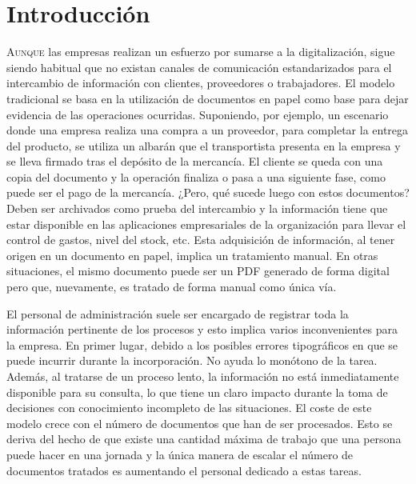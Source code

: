 

\chapter{Introducción}
\label{chap:introduccion}

\lettrine{A}{unque} las empresas realizan un esfuerzo por sumarse a la digitalización, sigue siendo habitual que no existan canales de comunicación estandarizados para el intercambio de información con clientes, proveedores o trabajadores. El modelo tradicional se basa en la utilización de documentos en papel como base para dejar evidencia de las operaciones ocurridas. Suponiendo, por ejemplo, un escenario donde una empresa realiza una compra a un proveedor, para completar la entrega del producto, se utiliza un albarán que el transportista presenta en la empresa y se lleva firmado tras el depósito de la mercancía. El cliente se queda con una copia del documento y la operación finaliza o pasa a una siguiente fase, como puede ser el pago de la mercancía. ¿Pero, qué sucede luego con estos documentos? Deben ser archivados como prueba del intercambio y la información tiene que estar disponible en las aplicaciones empresariales de la organización para llevar el control de gastos, nivel del stock, etc. Esta adquisición de información, al tener origen en un documento en papel, implica un tratamiento manual. En otras situaciones, el mismo documento puede ser un PDF generado de forma digital pero que, nuevamente, es tratado de forma manual como única vía.

El personal de administración suele ser encargado de registrar toda la información pertinente de los procesos y esto implica varios inconvenientes para la empresa. En primer lugar, debido a los posibles errores tipográficos en que se puede incurrir durante la incorporación. No ayuda lo monótono de la tarea. Además, al tratarse de un proceso lento, la información no está inmediatamente disponible para su consulta, lo que tiene un claro impacto durante la toma de decisiones con conocimiento incompleto de las situaciones. El coste de este modelo crece con el número de documentos que han de ser procesados. Esto se deriva del hecho de que existe una cantidad máxima de trabajo que una persona puede hacer en una jornada y la única manera de escalar el número de documentos tratados es aumentando el personal dedicado a estas tareas.

